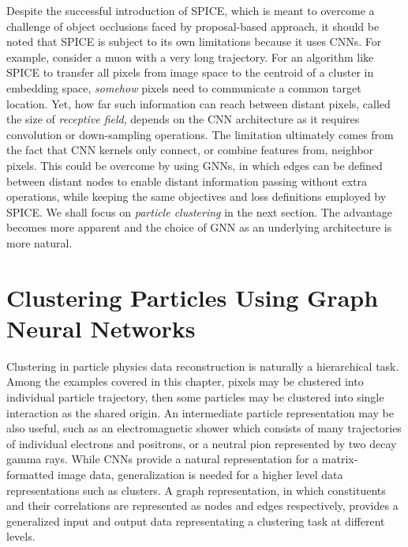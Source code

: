 \documentclass{ws-rv9x6}
\begin{document}
Despite the successful introduction of SPICE, which is meant to overcome a challenge of object occlusions faced by proposal-based approach, it should be noted that SPICE is subject to its own limitations because it uses CNNs. For example, consider a muon with a very long trajectory. For an algorithm like SPICE to transfer all pixels from image space to the centroid of a cluster in embedding space, {\it somehow} pixels need to communicate a common target location. Yet, how far such information can reach between distant pixels, called the size of {\it receptive field}, depends on the CNN architecture as it requires convolution or down-sampling operations. The limitation ultimately comes from the fact that CNN kernels only connect, or combine features from, neighbor pixels. This could be overcome by using GNNs, in which edges can be defined between distant nodes to enable distant information passing without extra operations, while keeping the same objectives and loss definitions employed by SPICE. We shall focus on {\it particle clustering} in the next section. The advantage becomes more apparent and the choice of GNN as an underlying architecture is more natural.

\section{Clustering Particles Using Graph Neural Networks}
Clustering in particle physics data reconstruction is naturally a hierarchical task. Among the examples covered in this chapter, pixels  may be clustered into individual particle trajectory, then some particles may be clustered into single interaction as the shared origin. An intermediate particle representation may be also useful, such as an electromagnetic shower which consists of many trajectories of individual electrons and positrons, or a neutral pion represented by two decay gamma rays. While CNNs provide a natural representation for a matrix-formatted image data, generalization is needed for a higher level data representations such as clusters. A graph representation, in which constituents and their correlations are represented as nodes and edges respectively, provides a generalized input and output data representating a clustering task at different levels. 
\end{document}
